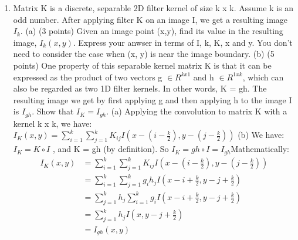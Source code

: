 \documentclass{article} %
\begin{document}
\begin{flushleft}
\begin{enumerate}
            \item Matrix K is a discrete, separable 2D filter kernel of size k x k. Assume k is an odd number. After applying
            filter K on an image I, we get a resulting image $I_{k}$.
            \bigbreak (a) (3 points) Given an image point (x,y), find its value in the resulting image, $I_{k}(x, y)$. Express your anwser 
            in terms of I, k, K, x and y. You don't need to consider the case when (x, y) is near the image boundary.
            \bigbreak(b) (5 points) One property of this separable kernel matrix K is that it can be expressed as the product of two vectors g $\in R^{kx1}$ and h $\in R^{1xk}$, which can also be regarded as two 1D filter kernels. In other words, K = gh. The resulting image we get by first applying g and then applying h to the image I is $I_{gh}$. Show that $I_{K} = I_{gh}$.
            \bigbreak (a) Applying the convolution to matrix K with a kernel k x k, we have: \break $I_{K}(x, y) = \sum_{i=1}^{k}\sum_{j=1}^{k}K_{ij}I(x-(i-\frac{k}{2}), y - (j - \frac{k}{2}))$
            \bigbreak (b) We have: $I_{K} = K \circ I $ , and K = gh (by definition). So $I_{K} = gh \circ I =  I_{gh}$\break Mathematically: \begin{equation} \begin{split}I_{K}(x, y)& = \sum_{i=1}^{k}\sum_{j=1}^{k}K_{ij}I(x-(i-\frac{k}{2}), y - (j - \frac{k}{2}))\\
                    & = \sum_{i=1}^{k}\sum_{j=1}^{k}g_{i}h_{j}I(x-i+\frac{k}{2}, y - j + \frac{k}{2}) \\
                    & = \sum_{j=1}^{k}h_{j}\sum_{i=1}^{k}g_{i}I(x-i+\frac{k}{2}, y - j + \frac{k}{2}) \\
                    & = \sum_{j=1}^{k}h_{j}I(x, y - j + \frac{k}{2}) \\
                    & = I_{gh}(x, y) 
            \end{split}\end{equation}
        \end{enumerate}

    \end{flushleft}
\end{document}
